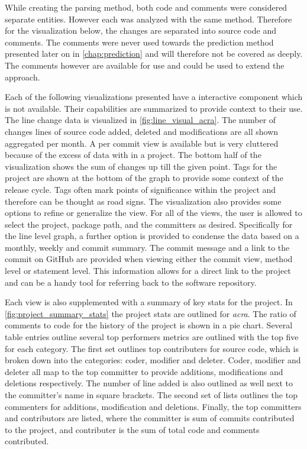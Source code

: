 While creating the parsing method, both code and comments were considered separate entities. However each was analyzed with the same method. Therefore for the visualization below, the changes are separated into source code and comments. The comments were never used towards the prediction method presented later on in \autoref{chap:prediction} and will therefore not be covered as deeply. The comments however are available for use and could be used to extend the approach.


Each of the following visualizations presented have a interactive component which is not available. Their capabilities are summarized to provide context to their use. The line change data is visualized in \autoref{fig:line_visual_acra}. The number of changes lines of source code added, deleted and modifications are all shown aggregated per month. A per commit view is available but is very cluttered because of the excess of data with in a project. The bottom half of the visualization shows the sum of changes up till the given point. Tags for the project are shown at the bottom of the graph to provide some context of the release cycle. Tags often mark points of significance within the project and therefore can be thought as road signs. The visualization also provides some options to refine or generalize the view. For all of the views, the user is allowed to select the project, package path, and the committers as desired. Specifically for the line level graph, a further option is provided to condense the data based on a monthly, weekly and commit summary. The commit message and a link to the commit on GitHub are provided when viewing either the commit view, method level or statement level. This information allows for a direct link to the project and can be a handy tool for referring back to the software repository.

Each view is also supplemented with a summary of key stats for the project. In \autoref{fig:project_summary_stats} the project stats are outlined for \textit{acra}. The ratio of comments to code for the history of the project is shown in a pie chart. Several table entries outline several top performers metrics are outlined with the top five for each category. The first set outlines top contributers for source code, which is broken down into the categories: coder, modifier and deleter. Coder, modifier and deleter all map to the top committer to provide additions, modifications and deletions respectively. The number of line added is also outlined as well next to the committer's name in square brackets. The second set of lists outlines the top commenters for additions, modification and deletions. Finally, the top committers and contributors are listed, where the committer is sum of commits contributed to the project, and contributer is the sum of total code and comments contributed.

